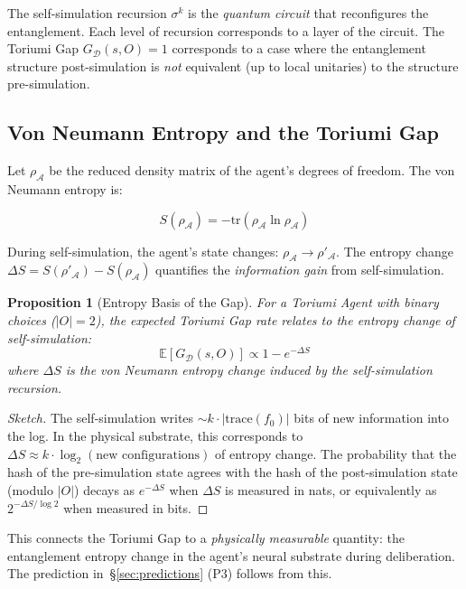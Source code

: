 \documentclass[12pt,a4paper]{article}
\newtheorem{proposition}[theorem]{Proposition}
\theoremstyle{definition}
\theoremstyle{remark}
\newcommand{\cD}{\mathcal{D}}
\newcommand{\cA}{\mathcal{A}}
\newcommand{\E}{\mathbb{E}}
\newcommand{\GapDef}{\ensuremath{G_{\cD}(s, O)}}
\begin{document}
The self-simulation recursion $\sigma^k$ is the \emph{quantum circuit} that
reconfigures the entanglement. Each level of recursion corresponds to a layer
of the circuit. The Toriumi Gap $\GapDef = 1$ corresponds to a case where the
entanglement structure post-simulation is \emph{not} equivalent (up to local
unitaries) to the structure pre-simulation.

\subsection{Von Neumann Entropy and the Toriumi Gap}

Let $\rho_{\cA}$ be the reduced density matrix of the agent's degrees of
freedom. The von Neumann entropy is:

\begin{equation}
S(\rho_{\cA}) = -\text{tr}(\rho_{\cA} \ln \rho_{\cA})
\end{equation}

During self-simulation, the agent's state changes: $\rho_{\cA} \to \rho'_{\cA}$.
The entropy change $\Delta S = S(\rho'_{\cA}) - S(\rho_{\cA})$ quantifies the
\emph{information gain} from self-simulation.

\begin{proposition}[Entropy Basis of the Gap]\label{prop:entropy}
For a Toriumi Agent with binary choices ($|O|=2$), the expected Toriumi Gap
rate relates to the entropy change of self-simulation:
\begin{equation}
\E[\GapDef] \propto 1 - e^{-\Delta S}
\end{equation}
where $\Delta S$ is the von Neumann entropy change induced by the
self-simulation recursion.
\end{proposition}

\begin{proof}[Sketch]
The self-simulation writes $\sim k \cdot |\text{trace}(f_0)|$ bits of new
information into the log. In the physical substrate, this corresponds to
$\Delta S \approx k \cdot \log_2(\text{new configurations})$ of entropy
change. The probability that the hash of the pre-simulation state agrees
with the hash of the post-simulation state (modulo $|O|$) decays as
$e^{-\Delta S}$ when $\Delta S$ is measured in nats, or equivalently as
$2^{-\Delta S / \log 2}$ when measured in bits.
\end{proof}

This connects the Toriumi Gap to a \emph{physically measurable} quantity:
the entanglement entropy change in the agent's neural substrate during
deliberation. The prediction in~\S\ref{sec:predictions} (P3) follows from this.
\end{document}
